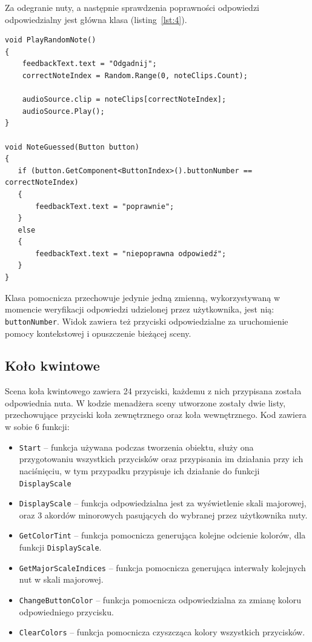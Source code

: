 Za odegranie nuty, a następnie sprawdzenia poprawności odpowiedzi odpowiedzialny jest główna klasa (listing~\ref{lst:4}).

\begin{lstlisting}[style=sharpcstyle,caption=Funkcje \texttt{PlayRandomNote} i \texttt{NoteGuessed}, label=lst:4]
void PlayRandomNote()
{
    feedbackText.text = "Odgadnij"; 
    correctNoteIndex = Random.Range(0, noteClips.Count);
    
    audioSource.clip = noteClips[correctNoteIndex];
    audioSource.Play();
}

void NoteGuessed(Button button)
{
   if (button.GetComponent<ButtonIndex>().buttonNumber == correctNoteIndex)
   {
       feedbackText.text = "poprawnie";
   }
   else
   {
       feedbackText.text = "niepoprawna odpowiedź";
   }
}
\end{lstlisting}

Klasa pomocnicza przechowuje jedynie jedną zmienną, wykorzystywaną w momencie weryfikacji odpowiedzi udzielonej przez użytkownika, jest nią: \texttt{buttonNumber}. Widok zawiera też przyciski odpowiedzialne za uruchomienie pomocy kontekstowej i opuszczenie bieżącej sceny.

\subsection{Koło kwintowe}

Scena koła kwintowego zawiera 24 przyciski, każdemu z nich przypisana została odpowiednia nuta. W kodzie menadżera sceny utworzone zostały dwie listy, przechowujące przyciski koła zewnętrznego oraz koła wewnętrznego. Kod zawiera w sobie 6 funkcji:

\begin{itemize}
\item \texttt{Start} -- funkcja używana podczas tworzenia obiektu, służy ona przygotowaniu wszystkich przycisków oraz przypisania im działania przy ich naciśnięciu, w tym przypadku przypisuje ich działanie do funkcji \texttt{DisplayScale}
\item \texttt{DisplayScale} -- funkcja odpowiedzialna jest za wyświetlenie skali majorowej, oraz 3 akordów minorowych pasujących do wybranej przez użytkownika nuty. 
\item \texttt{GetColorTint} -- funkcja pomocnicza generująca kolejne odcienie kolorów, dla funkcji \texttt{DisplayScale}.
\item \texttt{GetMajorScaleIndices} -- funkcja pomocnicza generująca interwały kolejnych nut w skali majorowej.
\item \texttt{ChangeButtonColor} -- funkcja pomocnicza odpowiedzialna za zmianę koloru odpowiedniego przycisku.
\item \texttt{ClearColors} -- funkcja pomocnicza czyszcząca kolory wszystkich przycisków.
\end{itemize}

